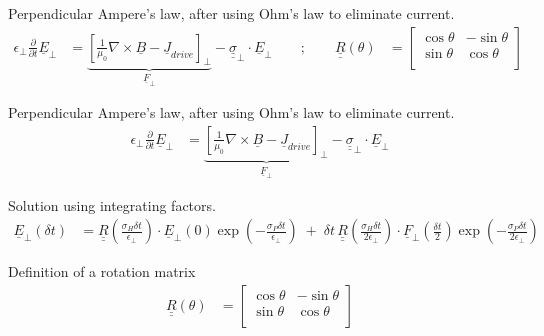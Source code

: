 \documentclass{article}
\begin{document}
Perpendicular Ampere’s law, after using Ohm’s law to eliminate current. 
\begin{align*}
  \epsilon_\bot \frac{\partial}{\partial t} \underline{E}_\bot &=
  \underbrace{
  \left[ \frac{1}{\mu_0} \nabla \times \underline{B} - \underline{J}_{drive} \right]_\bot 
  }_{ \underline{F}_\bot } - 
  \underline{ \underline{\sigma} }_\bot \! \cdot \underline{E}_\bot \qquad ; \qquad
  \underline{ \underline{R} }( \theta ) & = 
  \left[
  \begin{array}{cc}
    \cos\theta & -\sin\theta \\
    \sin\theta & \cos\theta \\
  \end{array}
  \right]
\end{align*}



Perpendicular Ampere’s law, after using Ohm’s law to eliminate current. 
\begin{align*}
  \epsilon_\bot \frac{\partial}{\partial t} \underline{E}_\bot &=
  \underbrace{
  \left[ \frac{1}{\mu_0} \nabla \times \underline{B} - \underline{J}_{drive} \right]_\bot 
  }_{ \underline{F}_\bot } - 
  \underline{ \underline{\sigma} }_\bot \! \cdot \underline{E}_\bot
\end{align*}




Solution using integrating factors. 
\begin{align*}
  \underline{E}_\bot \! ( \delta t )& = \underline{ \underline{R} } 
    ( {\scriptstyle \frac{\sigma_H \delta t}{\epsilon_\bot} } ) \cdot 
    \underline{E}_\bot \! ( 0 ) \exp ( {\scriptstyle -\frac{\sigma_P \delta t}{\epsilon_\bot} } ) \; +\;  
    \delta t \, \underline{ \underline{R} } 
    ( {\scriptstyle \frac{\sigma_H \delta t}{2 \epsilon_\bot} } ) \cdot
    \underline{F}_\bot \! ( {\scriptstyle \frac{\delta t}{2} } ) 
    \exp ( {\scriptstyle -\frac{\sigma_P \delta t}{2 \epsilon_\bot} } )
\end{align*}



Definition of a rotation matrix
\begin{align*}
  \underline{ \underline{R} }( \theta ) & = 
  \left[
  \begin{array}{cc}
    \cos\theta & -\sin\theta \\
    \sin\theta & \cos\theta \\
  \end{array}
  \right]
\end{align*}
\end{document}
